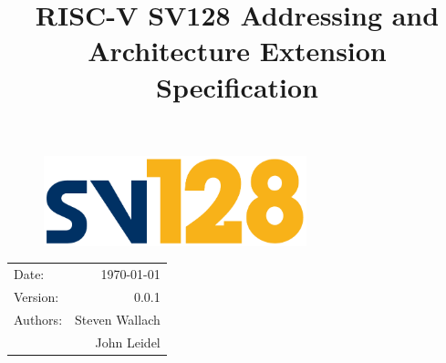 \documentclass{article}
\title{\textbf{RISC-V SV128 Addressing and\\Architecture Extension Specification}} %
\date{} %
\begin{document}
\begin{figure}
\vspace{2in}
\begin{center}
\includegraphics[width=3in]{figures/sv128.pdf} %
\end{center}
\end{figure}

\maketitle %

\thispagestyle{fancy}

\begin{center}
\begin{tabular}{l r}
Date: & \today \\
Version: & 0.0.1 \\ %
Authors: & Steven Wallach\\
& John Leidel
\end{tabular}
\end{center}

\clearpage

\tableofcontents

\clearpage




\clearpage
\listoffigures
\listoftables
\clearpage

\clearpage
\end{document}
